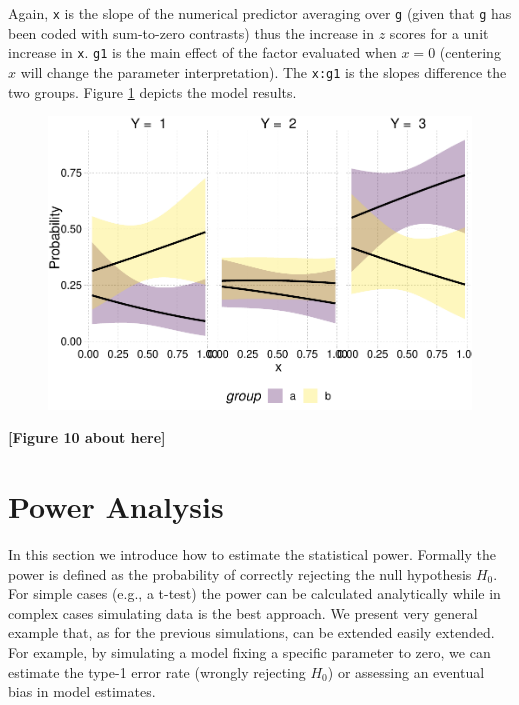 \documentclass[
  man,floatsintext]{apa6}
\begin{document}
\normalsize

Again, \texttt{x} is the slope of the numerical predictor averaging over \texttt{g} (given that \texttt{g} has been coded with sum-to-zero contrasts) thus the increase in \(z\) scores for a unit increase in \texttt{x}. \texttt{g1} is the main effect of the factor evaluated when \(x = 0\) (centering \(x\) will change the parameter interpretation). The \texttt{x:g1} is the slopes difference the two groups. Figure \ref{fig:fig-effects-num-by-cat-interaction} depicts the model results.

\scriptsize

\begin{figure}

{\centering \includegraphics{paper-new_files/figure-latex/fig-effects-num-by-cat-interaction-1} 

}

\caption{ }\label{fig:fig-effects-num-by-cat-interaction}
\end{figure}

\begin{center}\textbf{[Figure 10 about here]} \end{center}

\normalsize

\section{Power Analysis}\label{power-analysis}

In this section we introduce how to estimate the statistical power. Formally the power is defined as the probability of correctly rejecting the null hypothesis \(H_0\). For simple cases (e.g., a t-test) the power can be calculated analytically while in complex cases simulating data is the best approach. We present very general example that, as for the previous simulations, can be extended easily extended. For example, by simulating a model fixing a specific parameter to zero, we can estimate the type-1 error rate (wrongly rejecting \(H_0\)) or assessing an eventual bias in model estimates.
\end{document}
